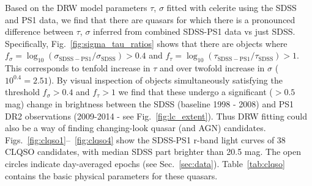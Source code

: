 \documentclass[twocolumn]{aastex62}
\newcommand{\project}[1]{\textsf{#1}}
\begin{document}
Based on the DRW model  parameters $\tau$, $\sigma$ fitted with \project{celerite} using the SDSS and PS1 data, we find that there are quasars for which there is a pronounced difference between $\tau$, $\sigma$  inferred from combined SDSS-PS1 data vs just SDSS. Specifically, Fig.~\ref{fig:sigma_tau_ratios} shows that there are objects where 
$f_{\sigma} = \log_{10}{\left( \sigma_{\mathrm{SDSS-PS1}} / \sigma_{\mathrm{SDSS}} \right)} > 0.4 $ and 
 $f_{\tau} = \log_{10}{\left( \tau_{\mathrm{SDSS-PS1}} / \tau_{\mathrm{SDSS}} \right)} > 1  $.  This corresponds to tenfold increase in $\tau$ and over twofold increase in $\sigma$ ($10^{0.4} = 2.51$). By visual inspection of objects simultaneously satisfying the threshold $f_{\sigma}> 0.4$ and $f_{\tau}> 1 $ we find that these undergo a significant ($>0.5$ mag) change in brightness between the SDSS (baseline 1998 - 2008) and PS1 DR2 observations (2009-2014 - see Fig.~\ref{fig:lc_extent}). Thus DRW fitting could also be a way of finding changing-look quasar (and AGN) candidates. Figs.~\ref{fig:clqso1}--~\ref{fig:clqso4} show the SDSS-PS1 r-band light curves of 38 CLQSO candidates, with median SDSS part brighter than 20.5 mag. The open circles indicate day-averaged epochs (see Sec.~\ref{sec:data}). Table~\ref{tab:clqso} contains the basic physical parameters for these quasars. 

\begin{figure*} %
\caption{Outliers in the space of recovered DRW parameters between SDSS and SDSS-PS1, as well as median offsets. Page 1.}
\label{fig:clqso1}
\end{figure*}

\begin{figure*}
\caption{As Fig.~\ref{fig:clqso1}, page 2. }
\label{fig:clqso2}
\end{figure*}


\begin{figure*}
\caption{As Fig.~\ref{fig:clqso1}, page 3. }
\label{fig:clqso3}
\end{figure*}

\begin{figure*}
\caption{As Fig.~\ref{fig:clqso1}, page 4. }
\label{fig:clqso4}
\end{figure*}
\end{document}

